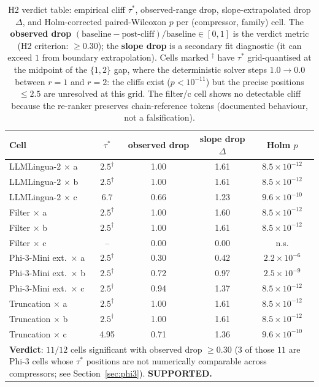 \begin{table}[htbp]
\centering
\caption{H2 verdict table: empirical cliff $\tau^{*}$, observed-range
drop, slope-extrapolated drop $\Delta$, and Holm-corrected
paired-Wilcoxon $p$ per (compressor, family) cell. The \textbf{observed drop}
$(\text{baseline}-\text{post-cliff})/\text{baseline}\in[0,1]$ is the
verdict metric (H2 criterion: $\ge0.30$); the \textbf{slope drop} is
a secondary fit diagnostic (it can exceed $1$ from boundary
extrapolation). Cells marked $^{\dagger}$ have $\tau^{*}$
grid-quantised at the midpoint of the $\{1,2\}$ gap, where the
deterministic solver steps $1.0\to0.0$ between $r=1$ and $r=2$: the
cliffs exist ($p<10^{-11}$) but the precise positions $\le2.5$ are
unresolved at this grid. The filter/c cell shows no detectable cliff
because the re-ranker preserves chain-reference tokens (documented
behaviour, not a falsification).}
\label{tab:h2_tau}
\small
\begin{tabular}{lcccc}
\hline
Cell & $\tau^{*}$ & observed drop & slope drop $\Delta$ & Holm $p$ \\
\hline
LLMLingua-2 $\times$ a   & $2.5^{\dagger}$ & 1.00 & 1.61 & $8.5\!\times\!10^{-12}$ \\
LLMLingua-2 $\times$ b   & $2.5^{\dagger}$ & 1.00 & 1.61 & $8.5\!\times\!10^{-12}$ \\
LLMLingua-2 $\times$ c   & 6.7 & 0.66 & 1.23 & $9.6\!\times\!10^{-10}$ \\
Filter $\times$ a        & $2.5^{\dagger}$ & 1.00 & 1.60 & $8.5\!\times\!10^{-12}$ \\
Filter $\times$ b        & $2.5^{\dagger}$ & 1.00 & 1.61 & $8.5\!\times\!10^{-12}$ \\
Filter $\times$ c        & -- & 0.00 & 0.00 & n.s. \\
Phi-3-Mini ext.\ $\times$ a & $2.5^{\dagger}$ & 0.30 & 0.42 & $2.2\!\times\!10^{-6}$ \\
Phi-3-Mini ext.\ $\times$ b & $2.5^{\dagger}$ & 0.72 & 0.97 & $2.5\!\times\!10^{-9}$ \\
Phi-3-Mini ext.\ $\times$ c & $2.5^{\dagger}$ & 0.94 & 1.37 & $8.5\!\times\!10^{-12}$ \\
Truncation $\times$ a    & $2.5^{\dagger}$ & 1.00 & 1.61 & $8.5\!\times\!10^{-12}$ \\
Truncation $\times$ b    & $2.5^{\dagger}$ & 1.00 & 1.61 & $8.5\!\times\!10^{-12}$ \\
Truncation $\times$ c    & 4.95 & 0.71 & 1.36 & $9.6\!\times\!10^{-10}$ \\
\hline
\multicolumn{5}{p{0.95\linewidth}}{\textbf{Verdict}: $11/12$ cells significant with observed drop $\ge 0.30$ ($3$ of those $11$ are Phi-3 cells whose $\tau^{*}$ positions are not numerically comparable across compressors; see Section~\ref{sec:phi3}). \textbf{SUPPORTED.}} \\
\hline
\end{tabular}
\end{table}

